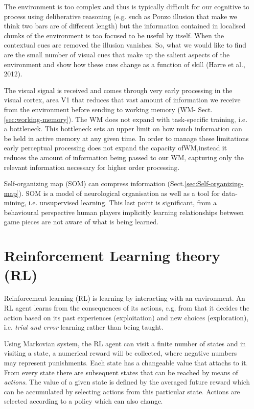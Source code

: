 The environment is too complex and thus is typically difficult for our cognitive
to process using deliberative reasoning (e.g. such as Ponzo illusion that make
we think two bars are of different length) but the information contained in
localised chunks of the environment is too focused to be useful by itself.
When the contextual cues are removed the illusion vanishes. So, what we would
like to find are the small number of visual cues that make up the salient
aspects of the environment and show how these cues change as a function of skill
(Harre et al., 2012).

The visual signal is received and comes through very early processing in the
visual cortex, area V1 that reduces that vast amount of information we receive
from the environment before sending to working memory (WM-
Sect.\ref{sec:working-memory}). The WM does not expand with
task-specific training, i.e. a bottleneck. This bottleneck sets an upper limit
on how much information can be held in active memory at any given time.
In order to manage these limitations early
perceptual processing does not expand the capacity ofWM,instead it
reduces the amount of information being passed to our WM, capturing
only the relevant information necessary for higher order processing.

Self-organizing map (SOM) can compress information
(Sect.\ref{sec:Self-organizing-map}). SOM is a model of neurological
organisation as well as a tool for data-mining, i.e.
unsupervised learning. This last point is significant, from a behavioural
perspective human players implicitly learning relationships between game pieces
are not aware of what is being learned.



\section{Reinforcement Learning theory (RL)}
\label{sec:reinforcement-learning}

Reinforcement learning (RL) is learning by interacting with an environment. 
An RL agent learns from the consequences of its actions, e.g. from that it
decides the action based on its past experiences (exploitation) and new choices
(exploration), i.e. {\it trial and error} learning rather than being taught.

Using Markovian system, the RL agent can visit a finite number of states and in
visiting a state, a numerical reward will be collected, where negative numbers
may represent punishments. Each state has a changeable value that attachs to it.
From every state there are subsequent states that can be reached by means of
{\it actions}. The value of a given state is defined by the averaged future
reward which can be accumulated by selecting actions from this particular state.
Actions are selected according to a policy which can also change.


